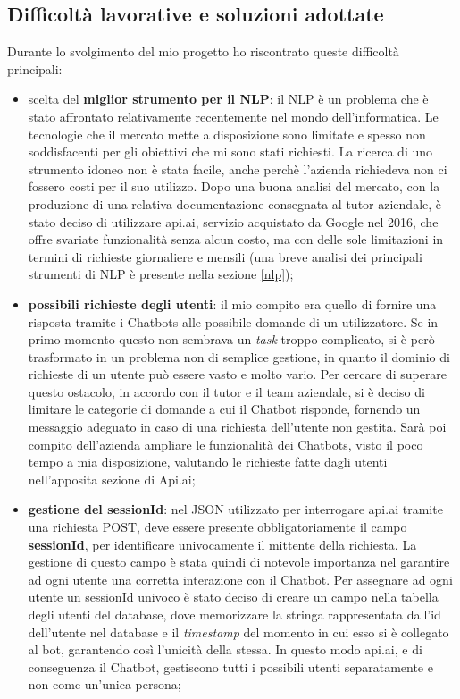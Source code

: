 \subsection{Difficoltà lavorative e soluzioni adottate}
Durante lo svolgimento del mio progetto ho riscontrato queste difficoltà principali:
\begin{itemize}
	\item scelta del \textbf{miglior strumento per il \gls{NLP}}: il \gls{NLP} è un problema che è stato affrontato relativamente recentemente nel mondo dell'informatica. Le tecnologie che il mercato mette a disposizione sono limitate e spesso non soddisfacenti per gli obiettivi che mi sono stati richiesti. La ricerca di uno strumento idoneo non è stata facile, anche perchè l'azienda richiedeva non ci fossero costi per il suo utilizzo. Dopo una buona analisi del mercato, con la produzione di una relativa documentazione consegnata al tutor aziendale, è stato deciso di utilizzare api.ai, servizio acquistato da Google nel 2016, che offre svariate funzionalità senza alcun costo, ma con delle sole limitazioni in termini di richieste giornaliere e mensili (una breve analisi dei principali strumenti di NLP è presente nella sezione \ref{nlp});
	\item \textbf{possibili richieste degli utenti}: il mio compito era quello di fornire una risposta tramite i \glspl{Chatbot} alle possibile domande di un utilizzatore. Se in primo momento questo non sembrava un \emph{task} troppo complicato, si è però trasformato in un problema non di semplice gestione, in quanto il dominio di richieste di un utente può essere vasto e molto vario. Per cercare di superare questo ostacolo, in accordo con il tutor e il team aziendale, si è deciso di limitare le categorie di domande a cui il \gls{Chatbot} risponde, fornendo un messaggio adeguato in caso di una richiesta dell'utente non gestita. Sarà poi compito dell'azienda ampliare le funzionalità dei \glspl{Chatbot}, visto il poco tempo a mia disposizione, valutando le richieste fatte dagli utenti nell'apposita sezione di Api.ai;
	\item \textbf{gestione del sessionId}: nel \gls{JSON} utilizzato per interrogare api.ai tramite una richiesta \gls{POST}, deve essere presente obbligatoriamente il campo \textbf{sessionId}, per identificare univocamente il mittente della richiesta. La gestione di questo campo è stata quindi di notevole importanza nel garantire ad ogni utente una corretta interazione con il \gls{Chatbot}. Per assegnare ad ogni utente un sessionId univoco è stato deciso di creare un campo nella tabella degli utenti del database, dove memorizzare la stringa rappresentata dall'id dell'utente nel database e il \emph{timestamp} del momento in cui esso si è collegato al bot, garantendo così l'unicità della stessa. In questo modo api.ai, e di conseguenza il \gls{Chatbot}, gestiscono tutti i possibili utenti separatamente e non come un'unica persona;

\end{itemize}
